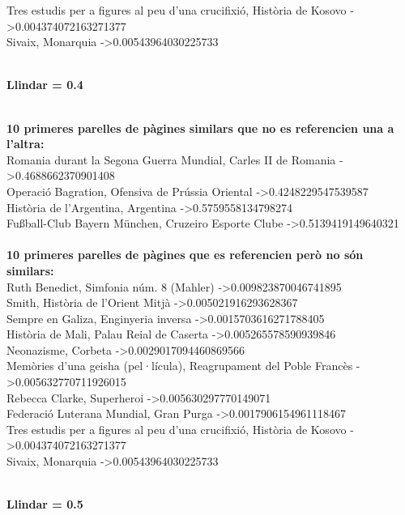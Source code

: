 \documentclass{report}
\begin{document}
Tres estudis per a figures al peu d'una crucifixió, Història de Kosovo -\textgreater 0.004374072163271377 \\
Sivaix, Monarquia -\textgreater 0.00543964030225733 \\
 \\
\newline
\centerline{ \textbf{Llindar = 0.4} }
\newline
 \\
\textbf{10 primeres parelles de pàgines similars que no es referencien una a l'altra:} \\
Romania durant la Segona Guerra Mundial, Carles II de Romania -\textgreater 0.4688662370901408 \\
Operació Bagration, Ofensiva de Prússia Oriental -\textgreater 0.4248229547539587 \\
Història de l'Argentina, Argentina -\textgreater 0.5759558134798274 \\
Fußball-Club Bayern München, Cruzeiro Esporte Clube -\textgreater 0.5139419149640321 \\
 \\
\textbf{10 primeres parelles de pàgines que es referencien però no són similars:} \\
Ruth Benedict, Simfonia núm. 8 (Mahler) -\textgreater 0.009823870046741895 \\
Smith, Història de l'Orient Mitjà -\textgreater 0.005021916293628367 \\
Sempre en Galiza, Enginyeria inversa -\textgreater 0.0015703616271788405 \\
Història de Mali, Palau Reial de Caserta -\textgreater 0.005265578590939846 \\
Neonazisme, Corbeta -\textgreater 0.0029017094460869566 \\
Memòries d'una geisha (pel·lícula), Reagrupament del Poble Francès -\textgreater 0.005632770711926015 \\
Rebecca Clarke, Superheroi -\textgreater 0.005630297770149071 \\
Federació Luterana Mundial, Gran Purga -\textgreater 0.0017906154961118467 \\
Tres estudis per a figures al peu d'una crucifixió, Història de Kosovo -\textgreater 0.004374072163271377 \\
Sivaix, Monarquia -\textgreater 0.00543964030225733 \\
 \\
\newline
\centerline{ \textbf{Llindar = 0.5} }
\newline
\end{document}
